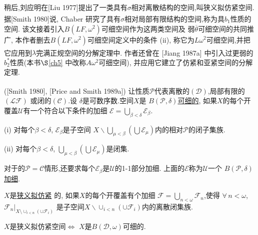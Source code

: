 \documentclass[main.tex]{subfiles}
\begin{document}
稍后,刘应明在[Liu 1977]\textsuperscript{\cite{Liu1977}}提出了一类具有$\sigma$相对离散结构的空间,叫狭义拟仿紧空间.
据[Smith 1980]\textsuperscript{\cite{Smith1980}}说, Chaber 研究了具有$\sigma$相对局部有限结构的空间,称为具$b_1$性质的空间.
该文接着引入$B(LF,\omega^2)$可细空间作为这两类空间及
弱$\overline{\theta}$可细空间的共同推广,
本作者删去$B(LF,\omega^2)$可细空间定义中的条件
 (ii), 称它为$L\omega^2$可细空间,并把它应用到$\lambda$完满正规空间的分解定理中.
 作者还曾在 [Jiang 1987a]\textsuperscript{\cite{Jiang1987a}} 中引入过更弱的$b_2^*$性质(本书$\S$\ref{ch5} 中改称$A\omega^2$可细空间),
 并应用它建立了仿紧和亚紧空间的分解定理.

\begin{definition}\label{def:2.4}
([Smith 1980],\textsuperscript{\cite{Smith1980}} 
[Price and Smith 1989a]\textsuperscript{\cite{PriceSmith1989a}})	
让性质$\mathcal{P}$代表离散的$(\mathcal{D})$,局部有限的$(\mathcal{LF})$
或闭的$(\mathcal{C})$.设
$\delta$是可数序数.空间$X$是
\underline{$B(\mathcal{P},\delta)$可细的},
如果$X$的每个开覆盖$\mathscr{U}$有一个符合以下条件的加细
$\mathscr{E}=\bigcup_{\beta<\delta}\mathscr{E}_\beta$.

(i) 对每个$\beta<\delta$, $\mathscr{E}_\beta$是子空间
$X\backslash\bigcup_{\mu<\beta}(\bigcup\mathscr{E}_\mu)$内的相对$\mathcal{P}$的闭子集族.

(ii) 对每个$\beta<\delta$, $\bigcup_{\mu<\beta}(\bigcup\mathscr{E}_\mu)$是闭集.

\noindent 对于的$\mathcal{P}=\mathcal{C}$情形,还要求每个$\mathscr{E}_\beta$是$\mathscr{U}$的\textnormal{1-1}部分加细.
上面的$\mathscr{E}$称为$\mathscr{U}$一个
\underline{$B(\mathcal{P},\delta)$加细}.
\end{definition}
	
\begin{definition}\label{def:2.5}
$X$是\underline{狭义拟仿紧}
的,
如果$X$的每个开覆盖有个加细
$\mathscr{F}=\bigcup_{n<\omega}\mathscr{F}_n$,使得
$\forall \, n < \omega$, $\mathscr{F}_n|_{X\setminus\cup_{i<n}(\cup\mathscr{F}_i)}$
是子空间$X\backslash\cup_{i<n}(\cup\mathscr{F}_i)$内的离散闭集族.
\end{definition}

\begin{fact} \label{fact:2.6}
$X$是狭义拟仿紧空间$\Leftrightarrow$ $X$是$B(\mathcal{D},\omega)$可细的.
\end{fact}
\end{document}
